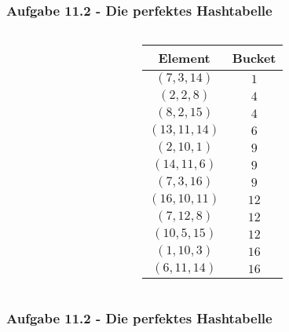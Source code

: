 \documentclass{beamer}
\begin{document}
\begin{frame}
	\frametitle{Aufgabe 11.2 - Die perfektes Hashtabelle}

	\begin{columns}
		\begin{column}{0.6\textwidth}
		\end{column}
		\begin{column}{0.38\textwidth}
			\begin{table}
				\centering
				\small
				\begin{tabular}{c|c}
					Element        & Bucket \\
					\hline
					$(7, 3, 14)$   & $1$    \\
					$(2, 2, 8)$    & $4$    \\
					$(8, 2, 15)$   & $4$    \\
					$(13, 11, 14)$ & $6$    \\
					$(2, 10, 1)$   & $9$    \\
					$(14, 11, 6)$  & $9$    \\
					$(7, 3, 16)$   & $9$    \\
					$(16, 10, 11)$ & $12$   \\
					$(7, 12, 8)$   & $12$   \\
					$(10, 5, 15)$  & $12$   \\
					$(1, 10, 3)$   & $16$   \\
					$(6, 11, 14)$  & $16$   \\
				\end{tabular}
			\end{table}
		\end{column}
	\end{columns}
\end{frame}

\begin{frame}
	\frametitle{Aufgabe 11.2 - Die perfektes Hashtabelle}

\end{frame}
\end{document}

